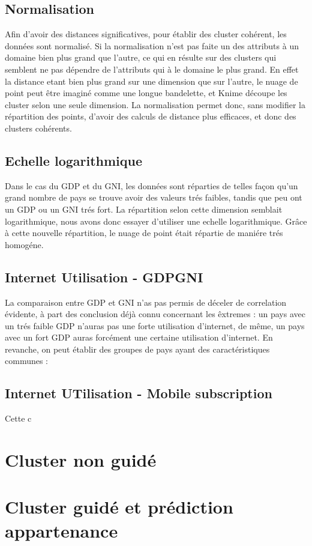     \subsection{Normalisation}
        Afin d'avoir des distances significatives, pour établir des cluster cohérent, les données sont normalisé.
        Si la normalisation n'est pas faite un des attributs à un domaine bien plus grand que l'autre, ce qui en résulte sur des clusters qui semblent ne pas dépendre de l'attributs qui à le domaine le plus grand.
        En effet la distance etant bien plus grand sur une dimension que sur l'autre, le nuage de point peut être imaginé comme une longue bandelette, et Knime découpe les cluster selon une seule dimension.
        La normalisation permet donc, sans modifier la répartition des points, d'avoir des calculs de distance plus efficaces, et donc des clusters cohérents.
        
    \subsection{Echelle logarithmique}
        Dans le cas du GDP et du GNI, les données sont réparties de telles façon qu'un grand nombre de pays se trouve avoir des valeurs trés faibles, tandis que peu ont un GDP ou un GNI trés fort.
        La répartition selon cette dimension semblait logarithmique, nous avons donc essayer d'utiliser une echelle logarithmique.
        Grâce à cette nouvelle répartition, le nuage de point était répartie de maniére trés homogéne.
        
    \subsection{Internet Utilisation - GDP\/GNI}
        La comparaison entre GDP et GNI n'as pas permis de déceler de correlation évidente, à part des conclusion déjà connu concernant les êxtremes : un pays avec un trés faible GDP n'auras pas une forte utilisation d'internet, de même, un pays avec un fort GDP auras forcément une certaine utilisation d'internet.
        En revanche, on peut établir des groupes de pays ayant des caractéristiques communes :
        
        
    \subsection{Internet UTilisation - Mobile subscription}
        Cette c


\section{Cluster non guidé}

\section{Cluster guidé et prédiction appartenance}
